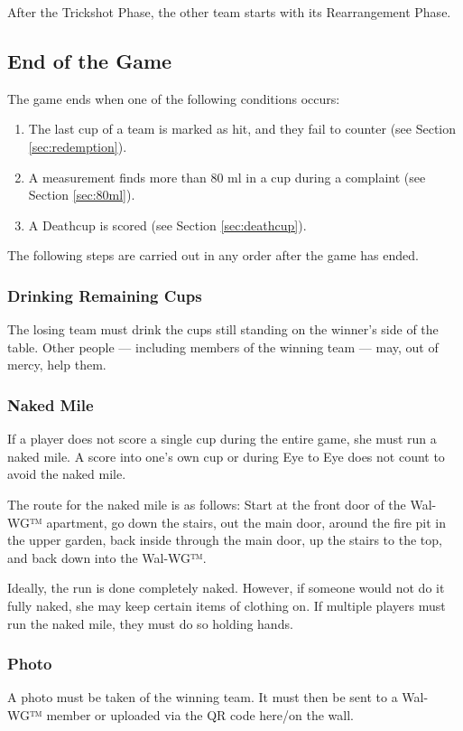 \documentclass[a5paper, 12pt]{book}
\begin{document}
After the Trickshot Phase, the other team starts with its Rearrangement Phase.

\subsection{End of the Game}\label{sec:spielende}

The game ends when one of the following conditions occurs:

\begin{enumerate}
    \item The last cup of a team is marked as hit, and they fail to counter (see Section \ref{sec:redemption}).
    \item A measurement finds more than 80 ml in a cup during a complaint (see Section \ref{sec:80ml}).
    \item A Deathcup is scored (see Section \ref{sec:deathcup}).
\end{enumerate}

The following steps are carried out in any order after the game has ended.

\subsubsection{Drinking Remaining Cups}
The losing team must drink the cups still standing on the winner’s side of the table.  
Other people — including members of the winning team — may, out of mercy, help them.

\subsubsection{Naked Mile}\label{sec:nacktemeile}
If a player does not score a single cup during the entire game, she must run a naked mile.  
A score into one’s own cup or during Eye to Eye does not count to avoid the naked mile.  

The route for the naked mile is as follows:  
Start at the front door of the Wal-WG™ apartment, go down the stairs, out the main door, around the fire pit in the upper garden, back inside through the main door, up the stairs to the top, and back down into the Wal-WG™.

Ideally, the run is done completely naked.  
However, if someone would not do it fully naked, she may keep certain items of clothing on.  
If multiple players must run the naked mile, they must do so holding hands.

\subsubsection{Photo}
A photo must be taken of the winning team.  
It must then be sent to a Wal-WG™ member or uploaded via the QR code here/on the wall.
\end{document}
